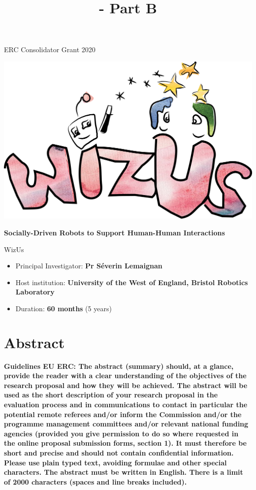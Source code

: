\documentclass[11pt,a4paper]{report}
\title{\project - Part B}
\newcommand{\project}{WizUs\xspace}
\newcommand{\eu}[1]{{\color{teal}\textbf{Guidelines EU ERC: #1}}}
\begin{document}
\maketitle

\begin{center}
    ERC Consolidator Grant 2020

    \vspace{2cm}
    \includegraphics[width=0.7\linewidth]{logo}

    \textbf{\LARGE Socially-Driven Robots to Support Human-Human Interactions}

    \vspace{2cm}
    {\Huge \project}

\end{center}

    \vspace{2cm}

\begin{itemize}
    \item Principal Investigator: \textbf{Pr Séverin Lemaignan}
    \item Host institution: \textbf{University of the West of England, Bristol Robotics
        Laboratory}
    \item Duration: \textbf{60 months} (5 years)
\end{itemize}

\section*{Abstract}\label{abstract}

\eu{The abstract (summary) should, at a glance, provide the reader with a clear
understanding of the objectives of the research proposal and how they will be
achieved. The abstract will be used as the short description of your research
proposal in the evaluation process and in communications to contact in
particular the potential remote referees and/or inform the Commission and/or the
programme management committees and/or relevant national funding agencies
(provided you give permission to do so where requested in the online proposal
submission forms, section 1). It must therefore be short and precise and should
not contain confidential information. \\
Please use plain typed text, avoiding formulae and other special characters. The
abstract must be written in English. There is a limit of 2000 characters (spaces
and line breaks included).}
\end{document}
